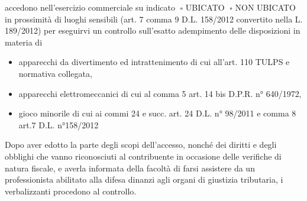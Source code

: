 \documentclass[12pt]{article}
\begin{document}
accedono nell’esercizio commerciale su indicato \begin{math} \;\square\end{math} UBICATO \begin{math}\;\square\end{math} NON UBICATO in prossimità di luoghi sensibili (art. 7 comma 9 D.L. 158/2012 convertito nella L. 189/2012)
per eseguirvi un controllo sull’esatto adempimento delle disposizioni in materia di
\begin{itemize}
    \item apparecchi da divertimento ed intrattenimento di cui all’art. 110 TULPS e normativa collegata,
    \item apparecchi elettromeccanici di cui al comma 5 art. 14 bis D.P.R. n° 640/1972,
    \item gioco minorile di cui ai commi 24 e succ. art. 24 D.L. n° 98/2011 e comma 8 art.7 D.L. n°158/2012
\end{itemize}
Dopo aver edotto la parte degli scopi dell’accesso, nonché dei diritti e degli obblighi che vanno riconosciuti al contribuente in occasione delle verifiche di natura fiscale, e averla informata della facoltà di farsi assistere da un professionista abilitato alla difesa dinanzi agli organi di giustizia tributaria, i verbalizzanti procedono al controllo.

\newpage
\end{document}
